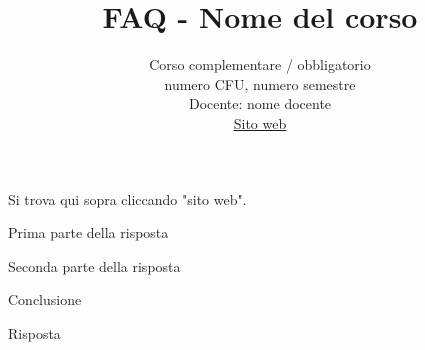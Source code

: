 \documentclass{article}
\title{FAQ - \textbf{Nome del corso}}
\author{
	Corso complementare / obbligatorio\\numero CFU, numero semestre\\
	Docente: nome docente\\ 
	\href{}{Sito web}
	\date{}
}
\begin{document}
 
\maketitle

\begin{QuestionList}

     {
        Si trova qui sopra cliccando "sito web".
    }
	
     {
        Prima parte della risposta 

        Seconda parte della risposta 

        Conclusione 
    }


     {
        Risposta 
    }
 
\end{QuestionList}
\end{document}
